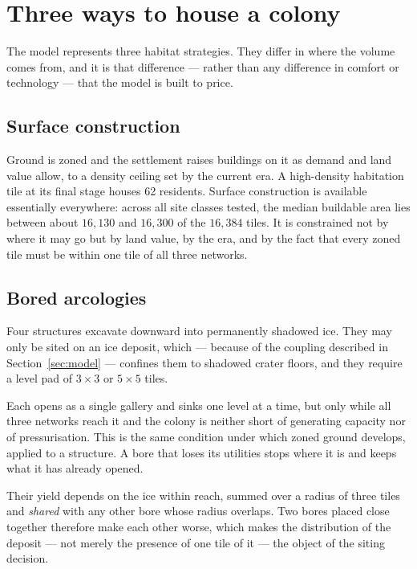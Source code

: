 \section{Three ways to house a colony}
\label{sec:habitats}

The model represents three habitat strategies. They differ in where the
volume comes from, and it is that difference --- rather than any difference in
comfort or technology --- that the model is built to price.

\subsection{Surface construction}

Ground is zoned and the settlement raises buildings on it as demand and land
value allow, to a density ceiling set by the current era. A high-density
habitation tile at its final stage houses 62 residents. Surface construction
is available essentially everywhere: across all site classes tested, the median
buildable area lies between about $16{,}130$ and $16{,}300$ of the $16{,}384$
tiles. It is constrained not by
where it may go but by land value, by the era, and by the fact that every
zoned tile must be within one tile of all three networks.

\subsection{Bored arcologies}

Four structures excavate downward into permanently shadowed ice. They may only
be sited on an ice deposit, which --- because of the coupling described in
Section~\ref{sec:model} --- confines them to shadowed crater floors, and they
require a level pad of $3\times3$ or $5\times5$ tiles.

Each opens as a single gallery and sinks one level at a time, but only while
all three networks reach it and the colony is neither short of generating
capacity nor of pressurisation. This is the same condition under which zoned
ground develops, applied to a structure. A bore that loses its utilities stops
where it is and keeps what it has already opened.

Their yield depends on the ice within reach, summed over a radius of three
tiles and \emph{shared} with any other bore whose radius overlaps. Two bores
placed close together therefore make each other worse, which makes the
distribution of the deposit --- not merely the presence of one tile of it ---
the object of the siting decision.

